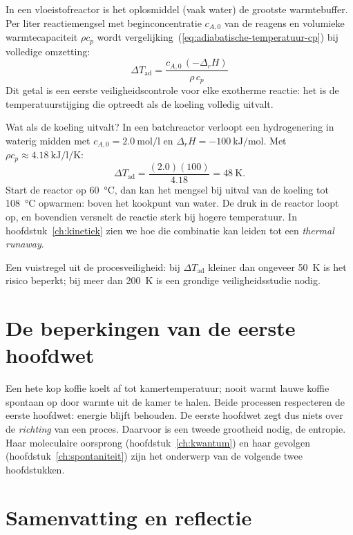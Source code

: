 In een vloeistofreactor is het oplosmiddel (vaak water) de grootste warmtebuffer. Per liter reactiemengsel met beginconcentratie $c_{A,0}$ van de reagens en volumieke warmtecapaciteit $\rho c_p$ wordt vergelijking~(\ref{eq:adiabatische-temperatuur-cp}) bij volledige omzetting:
\begin{equation}
\boxed{\Delta T_\mathrm{ad} = \frac{c_{A,0}\,(-\Delta_r H)}{\rho\,c_p}}
\label{eq:delta-T-ad}
\end{equation}
Dit getal is een eerste veiligheidscontrole voor elke exotherme reactie: het is de temperatuurstijging die optreedt als de koeling volledig uitvalt.

\begin{voorbeeld}{Wat als de koeling uitvalt?}
In een batchreactor verloopt een hydrogenering in waterig midden met $c_{A,0} = \SI{2.0}{\mole\per\litre}$ en $\Delta_r H = \SI{-100}{\kilo\joule\per\mole}$. Met $\rho c_p \approx \SI{4.18}{\kilo\joule\per\litre\per\kelvin}$:
\[
\Delta T_\mathrm{ad} = \frac{(2.0)(100)}{4.18} = \SI{48}{\kelvin}.
\]
Start de reactor op \SI{60}{\celsius}, dan kan het mengsel bij uitval van de koeling tot \SI{108}{\celsius} opwarmen: boven het kookpunt van water. De druk in de reactor loopt op, en bovendien versnelt de reactie sterk bij hogere temperatuur. In hoofdstuk~\ref{ch:kinetiek} zien we hoe die combinatie kan leiden tot een \emph{thermal runaway}.

Een vuistregel uit de procesveiligheid: bij $\Delta T_\mathrm{ad}$ kleiner dan ongeveer \SI{50}{\kelvin} is het risico beperkt; bij meer dan \SI{200}{\kelvin} is een grondige veiligheidsstudie nodig.
\end{voorbeeld}


\section{De beperkingen van de eerste hoofdwet}

Een hete kop koffie koelt af tot kamertemperatuur; nooit warmt lauwe koffie spontaan op door warmte uit de kamer te halen. Beide processen respecteren de eerste hoofdwet: energie blijft behouden. De eerste hoofdwet zegt dus niets over de \emph{richting} van een proces. Daarvoor is een tweede grootheid nodig, de entropie. Haar moleculaire oorsprong (hoofdstuk~\ref{ch:kwantum}) en haar gevolgen (hoofdstuk~\ref{ch:spontaniteit}) zijn het onderwerp van de volgende twee hoofdstukken.


\section{Samenvatting en reflectie}

